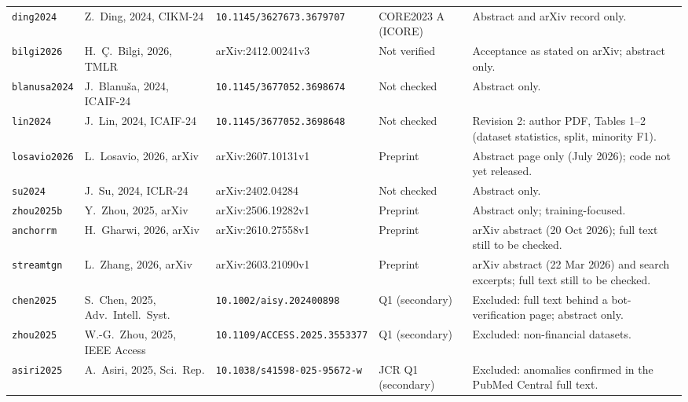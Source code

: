 \documentclass[11pt,a4paper]{article}
\begin{document}
\begin{table}[htbp]
\begin{tabularx}{\textwidth}{L{1.7cm} L{2.9cm} L{2.6cm} L{2.3cm} X}
\texttt{ding2024} & Z.~Ding, 2024, CIKM-24 & \nolinkurl{10.1145/3627673.3679707} & CORE2023 A (ICORE) & Abstract and arXiv record only. \\
\texttt{bilgi2026} & H.~\c{C}.~Bilgi, 2026, TMLR & arXiv:2412.00241v3 & Not verified & Acceptance as stated on arXiv; abstract only. \\
\texttt{blanusa2024} & J.~Blanu\v{s}a, 2024, ICAIF-24 & \nolinkurl{10.1145/3677052.3698674} & Not checked & Abstract only. \\
\texttt{lin2024} & J.~Lin, 2024, ICAIF-24 & \nolinkurl{10.1145/3677052.3698648} & Not checked & Revision 2: author PDF, Tables 1--2 (dataset statistics, split, minority F1). \\
\texttt{losavio2026} & L.~Losavio, 2026, arXiv & arXiv:2607.10131v1 & Preprint & Abstract page only (July 2026); code not yet released. \\
\texttt{su2024} & J.~Su, 2024, ICLR-24 & arXiv:2402.04284 & Not checked & Abstract only. \\
\texttt{zhou2025b} & Y.~Zhou, 2025, arXiv & arXiv:2506.19282v1 & Preprint & Abstract only; training-focused. \\
\texttt{anchorrm} & H.~Gharwi, 2026, arXiv & arXiv:2610.27558v1 & Preprint & arXiv abstract (20 Oct 2026); full text still to be checked. \\
\texttt{streamtgn} & L.~Zhang, 2026, arXiv & arXiv:2603.21090v1 & Preprint & arXiv abstract (22 Mar 2026) and search excerpts; full text still to be checked. \\
\midrule
\texttt{chen2025} & S.~Chen, 2025, Adv.\ Intell.\ Syst. & \nolinkurl{10.1002/aisy.202400898} & Q1 (secondary) & Excluded: full text behind a bot-verification page; abstract only. \\
\texttt{zhou2025} & W.-G.~Zhou, 2025, IEEE Access & \nolinkurl{10.1109/ACCESS.2025.3553377} & Q1 (secondary) & Excluded: non-financial datasets. \\
\texttt{asiri2025} & A.~Asiri, 2025, Sci.\ Rep. & \nolinkurl{10.1038/s41598-025-95672-w} & JCR Q1 (secondary) & Excluded: anomalies confirmed in the PubMed Central full text. \\
\bottomrule
\end{tabularx}
\end{table}



\end{document}
